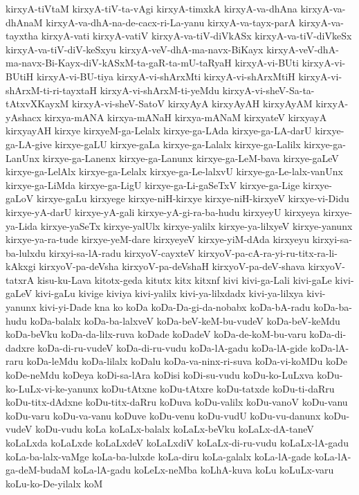 {kirxyA-tiVtaM
kirxyA-tiV-ta-vAgi
kirxyA-timxkA
kirxyA-va-dhAna
kirxyA-va-dhAnaM
kirxyA-va-dhA-na-de-cacx-ri-La-yanu
kirxyA-va-tayx-parA
kirxyA-va-tayxtha
kirxyA-vati
kirxyA-vatiV
kirxyA-va-tiV-diVkASx
kirxyA-va-tiV-diVkeSx
kirxyA-va-tiV-diV-keSxyu
kirxyA-veV-dhA-ma-navx-BiKayx
kirxyA-veV-dhA-ma-navx-Bi-Kayx-diV-kASxM-ta-gaR-ta-mU-taRyaH
kirxyA-vi-BUti
kirxyA-vi-BUtiH
kirxyA-vi-BU-tiya
kirxyA-vi-shArxMti
kirxyA-vi-shArxMtiH
kirxyA-vi-shArxM-ti-ri-tayxtaH
kirxyA-vi-shArxM-ti-yeMdu
kirxyA-vi-sheV-Sa-ta-tAtxvXKayxM
kirxyA-vi-sheV-SatoV
kirxyAyA
kirxyAyAH
kirxyAyAM
kirxyA-yAshacx
kirxya-mANA
kirxya-mANaH
kirxya-mANaM
kirxyateV
kirxyayA
kirxyayAH
kirxye
kirxyeM-ga-Lelalx
kirxye-ga-LAda
kirxye-ga-LA-darU
kirxye-ga-LA-give
kirxye-gaLU
kirxye-gaLa
kirxye-ga-Lalalx
kirxye-ga-Lalilx
kirxye-ga-LanUnx
kirxye-ga-Lanenx
kirxye-ga-Lanunx
kirxye-ga-LeM-bava
kirxye-gaLeV
kirxye-ga-LelAlx
kirxye-ga-Lelalx
kirxye-ga-Le-lalxvU
kirxye-ga-Le-lalx-vanUnx
kirxye-ga-LiMda
kirxye-ga-LigU
kirxye-ga-Li-gaSeTxV
kirxye-ga-Lige
kirxye-gaLoV
kirxye-gaLu
kirxyege
kirxye-niH-kirxye
kirxye-niH-kirxyeV
kirxye-vi-Didu
kirxye-yA-darU
kirxye-yA-gali
kirxye-yA-gi-ra-ba-hudu
kirxyeyU
kirxyeya
kirxye-ya-Lida
kirxye-yaSeTx
kirxye-yalUlx
kirxye-yalilx
kirxye-ya-lilxyeV
kirxye-yanunx
kirxye-ya-ra-tude
kirxye-yeM-dare
kirxyeyeV
kirxye-yiM-dAda
kirxyeyu
kirxyi-sa-ba-lulxdu
kirxyi-sa-lA-radu
kirxyoV-cayxteV
kirxyoV-pa-cA-ra-yi-ru-titx-ra-li-kAkxgi
kirxyoV-pa-deVsha
kirxyoV-pa-deVshaH
kirxyoV-pa-deV-shava
kirxyoV-tatxrA
kisu-ku-Lava
kitotx-geda
kitutx
kitx
kitxnf
kivi
kivi-ga-Lali
kivi-gaLe
kivi-gaLeV
kivi-gaLu
kivige
kiviya
kivi-yalilx
kivi-ya-lilxdadx
kivi-ya-lilxya
kivi-yanunx
kivi-yi-Dade
kna
ko
koDa
koDa-Da-gi-da-nobabx
koDa-bA-radu
koDa-ba-hudu
koDa-balalx
koDa-ba-lalxveV
koDa-beV-keM-bu-vudeV
koDa-beV-keMdu
koDa-beVku
koDa-da-lilx-ruva
koDade
koDadeV
koDa-de-koM-bu-varu
koDa-di-dadxre
koDa-di-ru-vudeV
koDa-di-ru-vudu
koDa-lA-gadu
koDa-lA-gide
koDa-lA-raru
koDa-leMdu
koDa-lilalx
koDalu
koDa-va-ninx-ri-suva
koDa-vi-koMDu
koDe
koDe-neMdu
koDeya
koDi-sa-lAra
koDisi
koDi-su-vudu
koDu-ko-LuLxva
koDu-ko-LuLx-vi-ke-yanunx
koDu-tAtxne
koDu-tAtxre
koDu-tatxde
koDu-ti-daRru
koDu-titx-dAdxne
koDu-titx-daRru
koDuva
koDu-valilx
koDu-vanoV
koDu-vanu
koDu-varu
koDu-va-vanu
koDuve
koDu-venu
koDu-vudU
koDu-vu-danunx
koDu-vudeV
koDu-vudu
koLa
koLaLx-balalx
koLaLx-beVku
koLaLx-dA-taneV
koLaLxda
koLaLxde
koLaLxdeV
koLaLxdiV
koLaLx-di-ru-vudu
koLaLx-lA-gadu
koLa-ba-lalx-vaMge
koLa-ba-lulxde
koLa-diru
koLa-galalx
koLa-lA-gade
koLa-lA-ga-deM-budaM
koLa-lA-gadu
koLeLx-neMba
koLhA-kuva
koLu
koLuLx-varu
koLu-ko-De-yilalx
koM
}

